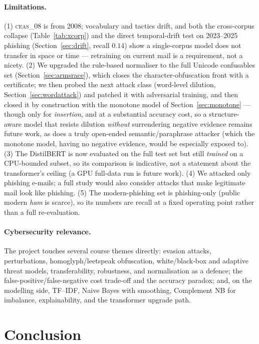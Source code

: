 \documentclass[11pt]{article}
\begin{document}
\paragraph{Limitations.} (1) \textsc{ceas\_08} is from 2008; vocabulary and tactics
drift, and both the cross-corpus collapse (Table~\ref{tab:xcorp}) and the direct
temporal-drift test on 2023--2025 phishing (Section~\ref{sec:drift}, recall $0.14$) show a
single-corpus model does not transfer in space or time --- retraining on current mail is a
requirement, not a nicety. (2) We upgraded the rule-based normaliser to the full Unicode
confusables set (Section~\ref{sec:armsrace}), which closes the character-obfuscation front
with a certificate; we then probed the next attack class (word-level dilution,
Section~\ref{sec:wordattack}) and patched it with adversarial training, and then closed it by
construction with the monotone model of Section~\ref{sec:monotone} --- though only for
\emph{insertion}, and at a substantial accuracy cost, so a structure-aware model that resists dilution
\emph{without} surrendering negative evidence remains future work, as does a truly open-ended
semantic/paraphrase attacker (which the monotone model, having no negative evidence, would be
especially exposed to). (3) The
DistilBERT is now evaluated on the full test set but still \emph{trained} on a CPU-bounded subset, so
its comparison is indicative, not a statement about the transformer's ceiling (a GPU full-data run is
future work). (4) We attacked only phishing e-mails; a full
study would also consider attacks that make legitimate mail look like phishing. (5) The
modern-phishing set is phishing-only (public modern \emph{ham} is scarce), so its numbers are
recall at a fixed operating point rather than a full re-evaluation.

\paragraph{Cybersecurity relevance.} The project touches several course themes
directly: evasion attacks, perturbations, homoglyph/leetspeak obfuscation,
white/black-box and adaptive threat models, transferability, robustness, and
normalisation as a defence; the false-positive/false-negative cost trade-off and the
accuracy paradox; and, on the modelling side, TF--IDF, Naive Bayes with smoothing,
Complement NB for imbalance, explainability, and the transformer upgrade path.

\section{Conclusion}
\end{document}
